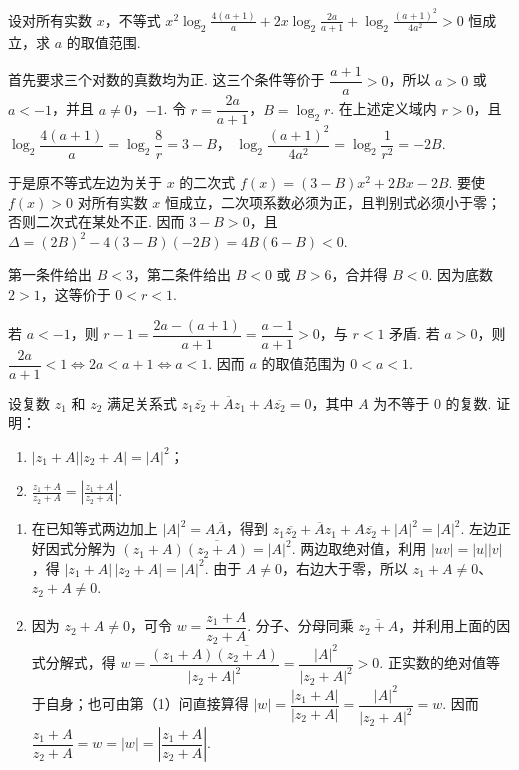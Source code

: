 \documentclass[UTF8,a4paper,oneside,11pt]{ctexbook}
\begin{document}
\begin{problem}

设对所有实数 \(x\)，不等式 \(x^2\log_2 \frac{4(a + 1)}{a} + 2x\log_2 \frac{2a}{a + 1} + \log_2 \frac{(a + 1)^2}{4a^2} > 0\) 恒成立，求 \(a\) 的取值范围.
\end{problem}

\begin{solution}
首先要求三个对数的真数均为正. 这三个条件等价于
\(\dfrac{a+1}{a}>0\)，所以 \(a>0\) 或 \(a<-1\)，并且 \(a\ne0\)，\(-1\). 令
\(r=\dfrac{2a}{a+1}\)，\(B=\log_2 r\). 在上述定义域内 \(r>0\)，且
\(\log_2\dfrac{4(a+1)}a=\log_2\dfrac8r=3-B\)，
\(\log_2\dfrac{(a+1)^2}{4a^2}=\log_2\dfrac1{r^2}=-2B\).

于是原不等式左边为关于 \(x\) 的二次式
\(f(x)=(3-B)x^2+2Bx-2B\). 要使 \(f(x)>0\) 对所有实数 \(x\) 恒成立，二次项系数必须为正，且判别式必须小于零；否则二次式在某处不正. 因而
\(3-B>0\)，且
\(\Delta=(2B)^2-4(3-B)(-2B)=4B(6-B)<0\).

第一条件给出 \(B<3\)，第二条件给出 \(B<0\) 或 \(B>6\)，合并得 \(B<0\). 因为底数 \(2>1\)，这等价于 \(0<r<1\).

若 \(a<-1\)，则
\(r-1=\dfrac{2a-(a+1)}{a+1}=\dfrac{a-1}{a+1}>0\)，与 \(r<1\) 矛盾. 若 \(a>0\)，则
\(\dfrac{2a}{a+1}<1\Longleftrightarrow 2a<a+1\Longleftrightarrow a<1\). 因而 \(a\) 的取值范围为 \(0<a<1\).
\end{solution}

\begin{problem}

设复数 \(z_1\) 和 \(z_2\) 满足关系式 \(z_1\overline{z_2} + \overline{A}z_1 + A\overline{z_2} = 0\)，其中 \(A\) 为不等于 \(0\) 的复数. 证明：

\begin{enumerate}
\item \(|z_1 + A||z_2 + A| = |A|^2\)；
\item \(\frac{z_1 + A}{z_2 + A} = \left|\frac{z_1 + A}{z_2 + A}\right|\).
\end{enumerate}
\end{problem}

\begin{solution}
\begin{enumerate}
\item 在已知等式两边加上 \(|A|^2=A\overline A\)，得到
\(z_1\overline{z_2}+\overline A z_1+A\overline{z_2}+|A|^2=|A|^2\). 左边正好因式分解为
\((z_1+A)\overline{(z_2+A)}=|A|^2\). 两边取绝对值，利用 \(|uv|=|u||v|\)，得
\(|z_1+A|\,|z_2+A|=|A|^2\). 由于 \(A\ne0\)，右边大于零，所以 \(z_1+A\ne0\)、\(z_2+A\ne0\).

\item 因为 \(z_2+A\ne0\)，可令 \(w=\dfrac{z_1+A}{z_2+A}\). 分子、分母同乘 \(\overline{z_2+A}\)，并利用上面的因式分解式，得
\(w=\dfrac{(z_1+A)\overline{(z_2+A)}}{|z_2+A|^2}=\dfrac{|A|^2}{|z_2+A|^2}>0\). 正实数的绝对值等于自身；也可由第（1）问直接算得
\(|w|=\dfrac{|z_1+A|}{|z_2+A|}=\dfrac{|A|^2}{|z_2+A|^2}=w\). 因而
\(\dfrac{z_1+A}{z_2+A}=w=|w|=\left|\dfrac{z_1+A}{z_2+A}\right|\).
\end{enumerate}
\end{solution}
\end{document}
